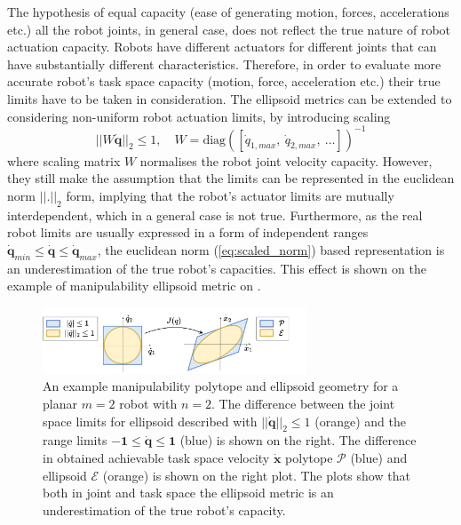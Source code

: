 The hypothesis of equal capacity (ease of generating motion, forces, accelerations etc.) all the robot joints, in general case, does not reflect the true nature of robot actuation capacity. Robots have different actuators for different joints that can have substantially different characteristics. Therefore, in order to evaluate more accurate robot's task space capacity (motion, force, acceleration etc.) their true limits have to be taken in consideration. The ellipsoid metrics can be extended to considering non-uniform robot actuation limits, by introducing scaling
\begin{equation}
    ||W\dot{\bm{q}}||_2 \leq 1, \quad W=\text{diag}\left(\left[\dot{q}_{1,max} ,~\dot{q}_{2,max} , ~\ldots\right]\right)^{-1}
    \label{eq:scaled_norm}
\end{equation}    
where scaling matrix $W$ normalises the robot joint velocity capacity. However, they still make the assumption that the limits can be represented in the euclidean norm  $||.||_2$ form, implying that the robot's actuator limits are mutually interdependent, which in a general case is not true\cite{Lee1997manip}. Furthermore, as the real robot limits are usually expressed in a form of independent ranges $ \dot{\bm{q}}_{min} \leq \dot{\bm{q}} \leq \dot{\bm{q}}_{max}$, the euclidean norm (\ref{eq:scaled_norm}) based representation is an underestimation of the true robot's capacities. This effect is shown on the example of manipulability ellipsoid metric on . 

\begin{figure}
    \centering
    \includegraphics[width=0.7\textwidth]{Chapters/imgs/ellip_poly.pdf}
    \caption{An example manipulability polytope and ellipsoid geometry for a planar $m=2$ robot with $n=2$. The difference between the joint space limits for ellipsoid described with $||\dot{\bm{q}}||_2\leq1$ (orange) and the range limits $\bm{-1}\leq\dot{\bm{q}}\leq\bm{1}$ (blue) is shown on the right. The difference in obtained achievable task space velocity $\dot{\bm{x}}$ polytope $\mathcal{P}$ (blue) and ellipsoid $\mathcal{E}$ (orange) is shown on the right plot. The plots show that both in joint and task space the ellipsoid metric is an underestimation of the true robot's capacity.}
    \label{fig:ellip_poly_dif}
\end{figure}

